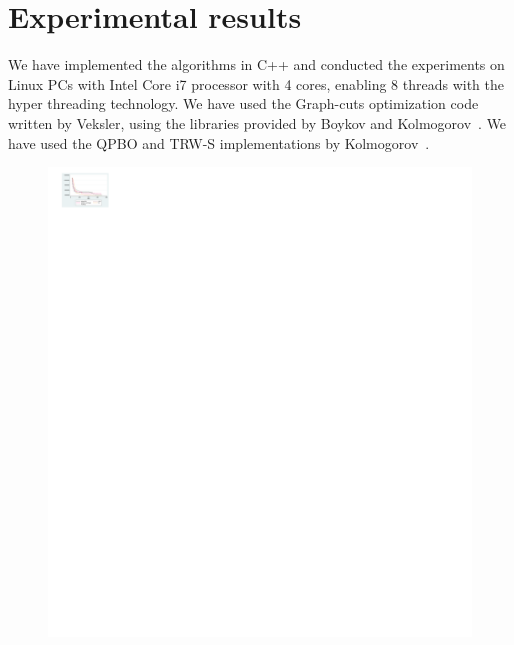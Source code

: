 \section{Experimental results} \label{section:results}
We have implemented the algorithms in C++ and conducted the experiments
on Linux PCs with Intel Core i7 processor with 4 cores, enabling 8 threads
with the hyper threading technology. We have used the Graph-cuts
optimization code written by Veksler, using the libraries provided by
Boykov and Kolmogorov~\cite{middle_bury,2,3,4_below}.
%
%
We have used the QPBO and TRW-S implementations by
Kolmogorov~\cite{msr_link?,trw_link}.



\begin{figure}[tb]
 \includegraphics[width=\columnwidth]{figure/result_layered_depthmap.pdf}
 \caption{}\label{fig:result_layered_depthmap}
\end{figure}
